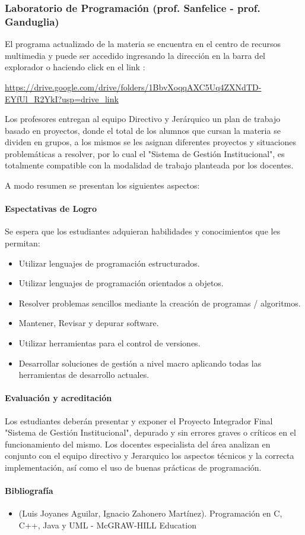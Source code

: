 \subsubsection{Laboratorio de Programación (prof. Sanfelice - prof. Ganduglia)}

El programa actualizado de la materia se encuentra en el centro de recursos multimedia y puede ser accedido ingresando la dirección en la barra del explorador o haciendo click en el link :


\url{https://drive.google.com/drive/folders/1BbvXoqqAXC5Uq4ZXNdTD-EYfUl_R2YkI?usp=drive_link}



Los profesores entregan al equipo Directivo y Jerárquico un plan de trabajo basado en proyectos, donde el total de los alumnos que cursan la materia se dividen en grupos, a los mismos se les asignan diferentes proyectos y situaciones problemáticas a resolver, por lo cual el "Sistema de Gestión Institucional", es totalmente compatible con la modalidad de trabajo planteada por los docentes.

A modo resumen se presentan los siguientes aspectos:
\paragraph{Espectativas de Logro}
Se espera que los estudiantes adquieran habilidades y conocimientos que les permitan: 

\begin{itemize}
    \item Utilizar lenguajes de programación estructurados.
    \item Utilizar lenguajes de programación orientados a objetos.
    \item Resolver problemas sencillos mediante la creación de programas / algoritmos.
    \item Mantener, Revisar y depurar software.
    \item Utilizar herramientas para el control de versiones.
    \item Desarrollar soluciones de gestión a nivel macro aplicando todas las herramientas de desarrollo actuales. 
\end{itemize}

\paragraph{Evaluación y acreditación}

Los estudiantes deberán presentar y exponer el Proyecto Integrador Final "Sistema de Gestión Institucional", depurado y sin errores graves o críticos en el funcionamiento del mismo. Los docentes especialista del área analizan en conjunto con el equipo directivo y Jerarquico los aspectos técnicos y la correcta implementación, así como el uso de buenas prácticas de programación.

\paragraph{Bibliografía}
\begin{itemize}
    \item  (Luis Joyanes Aguilar, Ignacio Zahonero Martínez). Programación en C, C++, Java y UML - McGRAW-HILL Education

\end{itemize}